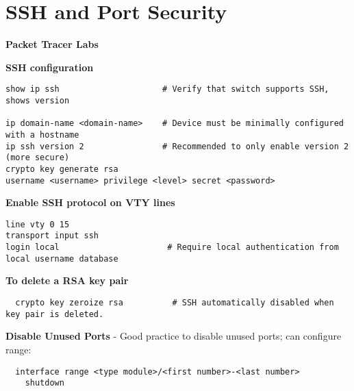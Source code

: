\documentclass[../EngineeringJournal_CDavis.tex]{subfiles}
\begin{document}

\chapter*{SSH and Port \linebreak[1] Security \hspace*{\fill}{2020}}
\noindent\textbf{{Packet Tracer Labs} }                             



\hspace{0.2cm}
\begin{tcolorbox}[width=6.3in]
{\bf{SSH configuration}}
\scriptsize
\begin{verbatim}
show ip ssh                     # Verify that switch supports SSH, shows version

ip domain-name <domain-name>    # Device must be minimally configured with a hostname
ip ssh version 2                # Recommended to only enable version 2 (more secure)
crypto key generate rsa
username <username> privilege <level> secret <password>
\end{verbatim}
\normalsize  
{\bf{Enable SSH protocol on VTY lines}}
\scriptsize 
  \begin{verbatim}
line vty 0 15
transport input ssh
login local                      # Require local authentication from local username database
  \end{verbatim}
\normalsize  
{\bf{To delete a RSA key pair}}
\scriptsize 
  \begin{verbatim}
  crypto key zeroize rsa          # SSH automatically disabled when key pair is deleted.
  \end{verbatim}
\end{tcolorbox}
\hspace{0.2cm}
\normalsize  





\hspace{0.2cm}
\begin{tcolorbox}[width=6.3in]
  {\bf{Disable Unused Ports}}
\scriptsize 
- Good practice to disable unused ports; can configure range:
  \begin{verbatim}
  interface range <type module>/<first number>-<last number>
    shutdown
  \end{verbatim}
\end{tcolorbox}
\hspace{0.2cm}
\normalsize  
\end{document}
